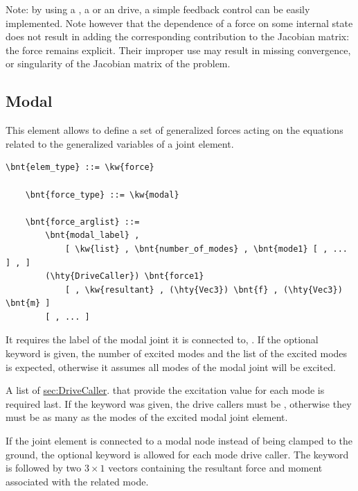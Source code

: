 \bigskip
Note: by using a , a  or an  drive,
a simple feedback control can be easily implemented.
Note however that the dependence of a force on some internal state
does not result in adding the corresponding contribution 
to the Jacobian matrix: the force remains explicit.
Their improper use may result in missing convergence,
or singularity of the Jacobian matrix of the problem.

\subsection{Modal}
\label{sec:ModalForceJoint}
This element allows to define a set of generalized forces
acting on the equations related to the generalized variables
of a  joint element.
\begin{Verbatim}[commandchars=\\\{\}]
    \bnt{elem_type} ::= \kw{force}

    \bnt{force_type} ::= \kw{modal}

    \bnt{force_arglist} ::=
        \bnt{modal_label} ,
            [ \kw{list} , \bnt{number_of_modes} , \bnt{mode1} [ , ... ] , ]
        (\hty{DriveCaller}) \bnt{force1}
            [ , \kw{resultant} , (\hty{Vec3}) \bnt{f} , (\hty{Vec3}) \bnt{m} ]
        [ , ... ]
\end{Verbatim}
It requires the label of the modal joint it is connected to,
.
If the optional keyword  is given, the number of excited modes
 and the list of the excited modes is expected,
otherwise it assumes all modes of the  modal joint
will be excited.

A list of
\hyperref{\kw{drive callers}}{\kw{drive callers} (see Section~}{)}{sec:DriveCaller}.
that provide the excitation value for each mode is required last.
If the keyword  was given, the drive callers
must be , otherwise they must be as many
as the modes of the excited modal joint element.

If the  joint element is connected to a modal node
instead of being clamped to the ground, the optional keyword 
is allowed for each mode drive caller.
The keyword  is followed by two $3\times 1$ vectors
containing the resultant force and moment associated with the related mode.

